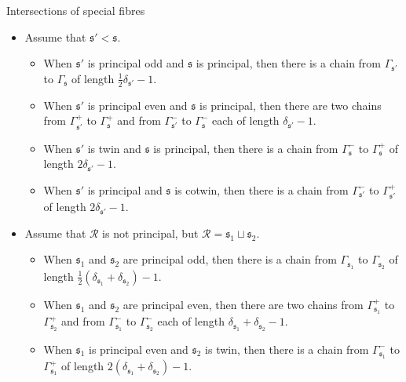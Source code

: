 \documentclass[10pt]{beamer}
\begin{document}
\begin{frame}[t]{Intersections of special fibres}

\begin{theorem}
\begin{itemize}
\item Assume that $ \mathfrak{s}' < \mathfrak{s} $.
\begin{itemize}
\item When $ \mathfrak{s}' $ is principal odd and $ \mathfrak{s} $ is principal, then there is a chain from $ \Gamma_{\mathfrak{s}'} $ to $ \Gamma_\mathfrak{s} $ of length $ \tfrac{1}{2}\delta_{\mathfrak{s}'} - 1 $.
\item When $ \mathfrak{s}' $ is principal even and $ \mathfrak{s} $ is principal, then there are two chains from $ \Gamma_{\mathfrak{s}'}^+ $ to $ \Gamma_\mathfrak{s}^+ $ and from $ \Gamma_{\mathfrak{s}'}^- $ to $ \Gamma_\mathfrak{s}^- $ each of length $ \delta_{\mathfrak{s}'} - 1 $.
\item When $ \mathfrak{s}' $ is twin and $ \mathfrak{s} $ is principal, then there is a chain from $ \Gamma_\mathfrak{s}^- $ to $ \Gamma_\mathfrak{s}^+ $ of length $ 2\delta_{\mathfrak{s}'} - 1 $.
\item When $ \mathfrak{s}' $ is principal and $ \mathfrak{s} $ is cotwin, then there is a chain from $ \Gamma_{\mathfrak{s}'}^- $ to $ \Gamma_{\mathfrak{s}'}^+ $ of length $ 2\delta_{\mathfrak{s}'} - 1 $.
\end{itemize}
\item Assume that $ \mathcal{R} $ is not principal, but $ \mathcal{R} = \mathfrak{s}_1 \sqcup \mathfrak{s}_2 $.
\begin{itemize}
\item When $ \mathfrak{s}_1 $ and $ \mathfrak{s}_2 $ are principal odd, then there is a chain from $ \Gamma_{\mathfrak{s}_1} $ to $ \Gamma_{\mathfrak{s}_2} $ of length $ \tfrac{1}{2}(\delta_{\mathfrak{s}_1} + \delta_{\mathfrak{s}_2}) - 1 $.
\item When $ \mathfrak{s}_1 $ and $ \mathfrak{s}_2 $ are principal even, then there are two chains from $ \Gamma_{\mathfrak{s}_1}^+ $ to $ \Gamma_{\mathfrak{s}_2}^+ $ and from $ \Gamma_{\mathfrak{s}_1}^- $ to $ \Gamma_{\mathfrak{s}_2}^- $ each of length $ \delta_{\mathfrak{s}_1} + \delta_{\mathfrak{s}_2} - 1 $.
\item When $ \mathfrak{s}_1 $ is principal even and $ \mathfrak{s}_2 $ is twin, then there is a chain from $ \Gamma_{\mathfrak{s}_1}^- $ to $ \Gamma_{\mathfrak{s}_1}^+ $ of length $ 2(\delta_{\mathfrak{s}_1} + \delta_{\mathfrak{s}_2}) - 1 $.
\end{itemize}
\end{itemize}
\end{theorem}

\end{frame}
\end{document}
